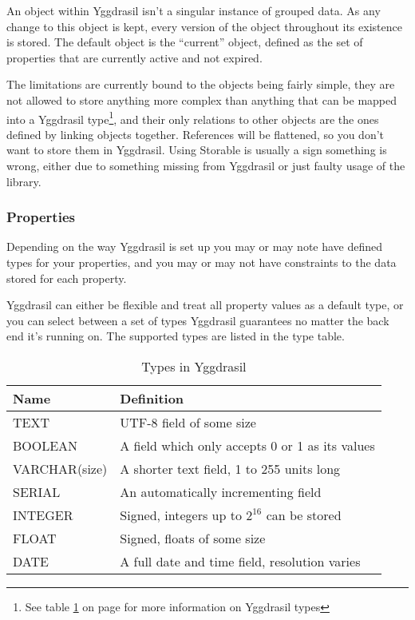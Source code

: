 \documentclass[english,a4paper]{article}
\begin{document}
An object within Yggdrasil isn't a singular instance of grouped data.
As any change to this object is kept, every version of the object
throughout its existence is stored.  The default object is the
``current'' object, defined as the set of properties that are
currently active and not expired.

The limitations are currently bound to the objects being fairly
simple, they are not allowed to store anything more complex than
anything that can be mapped into a Yggdrasil type\footnote{See table
  \ref{types} on page \pageref{types} for more information on
  Yggdrasil types}, and their only relations to other objects are the
ones defined by linking objects together.  References will be
flattened, so you don't want to store them in Yggdrasil.  Using
Storable is usually a sign something is wrong, either due to something
missing from Yggdrasil or just faulty usage of the library.


\subsubsection{Properties}

Depending on the way Yggdrasil is set up you may or may note have
defined types for your properties, and you may or may not have
constraints to the data stored for each property.  

Yggdrasil can either be flexible and treat all property values as a
default type, or you can select between a set of types Yggdrasil
guarantees no matter the back end it's running on.  The supported
types are listed in the type table.

\begin{table}[h]
\centering
\caption{Types in Yggdrasil}
\label{types}

\begin{tabular}{l l}
\hline %
Name & Definition  \\
\hline
TEXT & UTF-8 field of some size \\
BOOLEAN & A field which only accepts 0 or 1 as its values \\
VARCHAR(size) & A shorter text field, 1 to 255 units long \\
SERIAL & An automatically incrementing field \\
INTEGER & Signed, integers up to $2^16$ can be stored \\
FLOAT & Signed, floats of some size \\
DATE & A full date and time field, resolution varies \\
\end{tabular}
\end{table}
\end{document}
